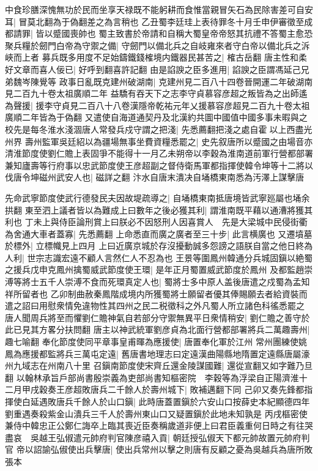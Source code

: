 中食珍膳深愧無功於民而坐享天禄既不能躬耕而食惟當親冒矢石為民除害差可自安耳|{
	冒莫北翻為于偽翻差之為言稍也}
乙丑蜀李廷珪上表待罪冬十月壬申伊審徵至成都請罪|{
	皆以蹙國喪帥也}
蜀主致書於帝請和自稱大蜀皇帝帝怒其抗禮不答蜀主愈恐聚兵糧於劒門白帝為守禦之備|{
	守劒門以備北兵之自岐雍來者守白帝以備北兵之泝峽而上者}
募兵既多用度不足始鑄鐵錢榷境内鐵器民甚苦之|{
	榷古岳翻}
唐主性和柔好文章而喜人佞已|{
	好呼到翻喜許記翻}
由是諂諛之臣多進用|{
	諂諛之臣謂馮延己兄弟魏岑陳覺等}
政事日亂既克建州破湖南|{
	克建州見二百八十四卷晉開運二年破湖南見二百九十卷太祖廣順二年}
益驕有吞天下之志李守貞慕容彦超之叛皆為之出師遙為聲援|{
	援李守貞見二百八十八卷漢隱帝乾祐元年乂援慕容彦超見二百九十卷太祖廣順二年皆為于偽翻}
又遣使自海道通契丹及北漢約共圖中國值中國多事未暇與之校先是每冬淮水淺涸唐人常發兵戍守謂之把淺|{
	先悉薦翻把淺之處自霍以上西盡光州界}
壽州監軍吳廷紹以為疆場無事坐費資糧悉罷之|{
	史先叙唐所以蹙國之由場音亦}
清淮節度使劉仁贍上表固爭不能得十一月乙未朔帝以李穀為淮南道前軍行營都部署兼知廬壽等行府事以忠武節度使王彦超副之督侍衛馬軍都指揮使韓令坤等十二將以伐唐令坤磁州武安人也|{
	磁詳之翻}
汴水自唐末潰决自埇橋東南悉為汚澤上謀擊唐

先命武寧節度使武行德發民夫因故堤疏導之|{
	自埇橋東南抵唐境皆武寧廵屬也埇余拱翻}
東至泗上議者皆以為難成上曰數年之後必獲其利|{
	謂淮南既平藉以通漕將獲其利也}
丁未上與侍臣論刑賞上曰朕必不因怒刑人因喜賞人　先是大梁城中民侵街衢為舍通大車者蓋寡|{
	先悉薦翻}
上命悉直而廣之廣者至三十步|{
	此言横廣也}
又遷墳墓於標外|{
	立標幟見上四月}
上曰近廣京城於存沒擾動誠多怨謗之語朕自當之他日終為人利|{
	世宗志識宏遠不顧人言然仁人不忍為也}
王景等圍鳳州韓通分兵城固鎭以絶蜀之援兵戊申克鳳州擒蜀威武節度使王環|{
	是年正月蜀置威武節度於鳳州}
及都監趙崇溥等將士五千人崇溥不食而死環真定人也|{
	蜀將士多中原人盖後唐遣之戍蜀為孟知祥所留者也}
乙卯制曲赦秦鳳階成境内所獲蜀將士願留者優其俸賜願去者給資裝而遣之詔曰用慰衆情免違物性其四州之民二税徵科之外凡蜀人所立諸色科徭悉罷之　唐人聞周兵將至而懼劉仁贍神氣自若部分守禦無異平日衆情稍安|{
	劉仁贍之善守於此已見其方畧分扶問翻}
唐主以神武統軍劉彦貞為北面行營都部署將兵二萬趣壽州|{
	趣七喻翻}
奉化節度使同平章事皇甫暉為應援使|{
	唐置奉化軍於江州}
常州團練使姚鳳為應援都監將兵三萬屯定遠|{
	舊唐書地理志曰定遠漢曲陽縣地隋置定遠縣唐屬濠州九域志在州南八十里}
召鎭南節度使宋齊丘還金陵謀國難|{
	還從宣翻又如字難乃旦翻}
以翰林承旨戶部尚書殷崇義為吏部尚書知樞密院　李穀等為浮梁自正陽濟淮十二月甲戌穀奏王彦超敗唐兵二千餘人於壽州城下|{
	敗補邁翻下同}
己卯又奏先鋒都指揮使白延遇敗唐兵千餘人於山口鎭|{
	此時唐蓋置鎭於六安山口按薛史本紀顯德四年劉重遇奏殺紫金山潰兵三千人於壽州東山口又疑置鎭於此地未知孰是}
丙戌樞密使兼侍中韓忠正公鄭仁誨卒上臨其喪近臣奏稱歲道非便上曰君臣義重何日時之有往哭盡哀　吳越王弘俶遣元帥府判官陳彦禧入貢|{
	朝廷授弘俶天下都元帥故置元帥府判官}
帝以詔諭弘俶使出兵擊唐|{
	使出兵常州以擊之則唐有反顧之憂為吳越兵為唐所敗張本}


